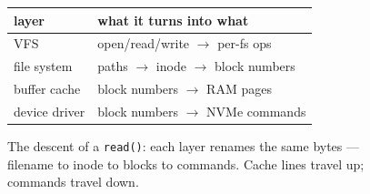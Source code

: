 \begin{figure}[htbp]
\centering
\begin{tabular}{ll}
\toprule
layer & what it turns into what \\
\midrule
VFS & open/read/write $\to$ per-fs ops \\
file system & paths $\to$ inode $\to$ block numbers \\
buffer cache & block numbers $\to$ RAM pages \\
device driver & block numbers $\to$ NVMe commands \\
\bottomrule
\end{tabular}
\caption{The descent of a \texttt{read()}: each layer renames the
same bytes --- filename to inode to blocks to commands. Cache
lines travel up; commands travel down.}
\label{fig:layers14}
\end{figure}
